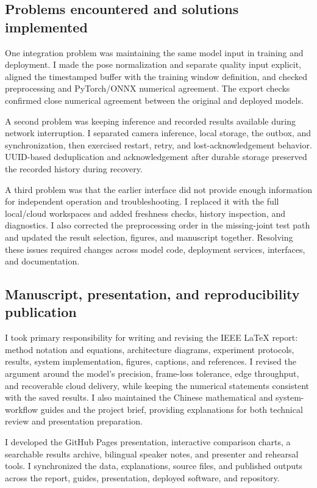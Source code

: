 \documentclass[conference,a4paper]{IEEEtran}
\begin{document}
\subsection{Problems encountered and solutions implemented}

One integration problem was maintaining the same model input in training and deployment. I made the pose normalization and separate quality input explicit, aligned the timestamped buffer with the training window definition, and checked preprocessing and PyTorch/ONNX numerical agreement. The export checks confirmed close numerical agreement between the original and deployed models.

A second problem was keeping inference and recorded results available during network interruption. I separated camera inference, local storage, the outbox, and synchronization, then exercised restart, retry, and lost-acknowledgement behavior. UUID-based deduplication and acknowledgement after durable storage preserved the recorded history during recovery.

A third problem was that the earlier interface did not provide enough information for independent operation and troubleshooting. I replaced it with the full local/cloud workspaces and added freshness checks, history inspection, and diagnostics. I also corrected the preprocessing order in the missing-joint test path and updated the result selection, figures, and manuscript together. Resolving these issues required changes across model code, deployment services, interfaces, and documentation.

\subsection{Manuscript, presentation, and reproducibility publication}

I took primary responsibility for writing and revising the IEEE LaTeX report: method notation and equations, architecture diagrams, experiment protocols, results, system implementation, figures, captions, and references. I revised the argument around the model's precision, frame-loss tolerance, edge throughput, and recoverable cloud delivery, while keeping the numerical statements consistent with the saved results. I also maintained the Chinese mathematical and system-workflow guides and the project brief, providing explanations for both technical review and presentation preparation.

I developed the GitHub Pages presentation, interactive comparison charts, a searchable results archive, bilingual speaker notes, and presenter and rehearsal tools. I synchronized the data, explanations, source files, and published outputs across the report, guides, presentation, deployed software, and repository.
\end{document}
